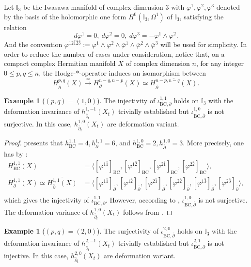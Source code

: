 \documentclass[12pt]{amsart}
\numberwithin{equation}{section}
\theoremstyle{definition}
\newtheorem{example}  [theorem]     {Example}
\theoremstyle{definition}
\theoremstyle{definition}
\newcommand{\w}{\wedge}
\renewcommand{\1}{\mathsf{1}}
\newcommand{\db}{\overline{\partial}}
\renewcommand{\>}{\rightarrow}
\newcommand{\p}{\partial}
\newcommand{\bp}{\overline\partial}
\def\p{\partial}
\def\w{\wedge}
\theoremstyle{plain} %
\theoremstyle{plain} %
\theoremstyle{plain} %
\begin{document}
    \vspace{0.4em}
	Let $\mathbb{I}_3$ be the Iwasawa manifold of complex dimension $3$ with $\varphi^1,\varphi^2,\varphi^3$
	denoted by the basis of the holomorphic one form $H^0(\mathbb{I}_3,\Omega^1)$ of $\mathbb{I}_3$, satisfying
	the relation \[ d\varphi^1 =0,\ d \varphi^2=0,\ d\varphi^3 = - \varphi^1 \w \varphi^2. \]
	And the convention $\varphi^{12\bar{1}\bar{2}\bar{3}}:= \varphi^1 \w \varphi^2 \w \overline{\varphi}^1\w \overline{\varphi}^2\w \overline{\varphi}^3$
	will be used for simplicity. In order to reduce the number of cases under consideration, notice that, on a compact complex Hermitian manifold $X$ of complex dimension $n$, for any integer $0\leq{p,q}\leq n$, the Hodge-$*$-operator induces an isomorphism between
	$$
	H_{\bar{\partial}}^{p, q}(X) \stackrel{\simeq}{\longrightarrow} H_{\partial}^{n-q, n-p}(X) \simeq \overline{H_{\bar{\partial}}^{n-p, n-q}(X)}.
	$$
	\begin{example}[$(p,q)=(1,0)$]\label{example 1}
		The injectivity of $\iota^{1,1}_{\mathrm {BC},\p}$ holds on $\mathbb{I}_3$
		with the deformation invariance of $h^{1,-1}_{\db_t}(X_t)$ trivially established but
		$\iota^{1,0}_{\mathrm {BC},\bp}$ is not surjective. In this case, $h^{1,0}_{\db_t}(X_t)$ are deformation variant.
	\end{example}
	\begin{proof}
		\cite[Appendix]{Ag13} presents that $h_{\mathrm {BC}}^{1,1}=4, h_{\p}^{1,1}=6$, and $h_{\mathrm {BC}}^{1,0}=2, h_{\bp}^{1,0}=3$. More precisely, one has by \cite[p.   6]{Sc07}:
		\[ \begin{aligned}
			H^{1,1}_{\mathrm {BC}}(X) &= \langle[\varphi^{1\bar{1}}]_{\mathrm {BC}}, [\varphi^{1\bar{2}}]_{\mathrm {BC}},[\varphi^{2\bar{1}}]_{\mathrm {BC}},[\varphi^{2\bar{2}}]_{\mathrm {BC}} \rangle, \\
			H^{1,1}_{\p}(X)\simeq{\overline{H_{\bp}^{1,1}(X)}} &= \langle[\varphi^{1\bar{1}}]_{\bp}, [\varphi^{1\bar{2}}]_{\bp},[\varphi^{2\bar{1}}]_{\bp},[\varphi^{2\bar{2}}]_{\bp}, [\varphi^{1\bar{3}}]_{\bp},[\varphi^{2\bar{3}}]_{\bp}\rangle, \\
		\end{aligned}\]
		which gives the injectivity of $\iota^{1,1}_{\mathrm {BC},\p}$. However, according to \cite[Last para. in Section 1.c]{Sc07}, $\iota^{1,0}_{\mathrm {BC},\bp}$ is not surjective. The deformation variance of $h^{1,0}_{\db_t}(X_t)$ follows from \cite[Appendix]{Ag13}.
	\end{proof}
	\begin{example}[$(p,q)=(2,0)$]\label{example 2}
		The surjectivity of $\iota^{2,0}_{\mathrm {BC},\bp}$ holds on $\mathbb{I}_3$
		with the deformation invariance of $h^{2,-1}_{\db_t}(X_t)$ trivially established but
		$\iota^{2,1}_{\mathrm {BC},\p}$ is not injective. In this case, $h^{2,0}_{\db_t}(X_t)$ are deformation variant.
	\end{example}
\end{document}
